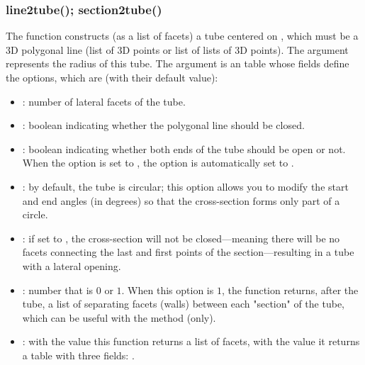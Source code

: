 \subsubsection{line2tube(); section2tube()}

The function  constructs (as a list of facets) a tube centered on , which must be a 3D polygonal line (list of 3D points or list of lists of 3D points). The argument  represents the radius of this tube. The argument  is an table whose fields define the options, which are (with their default value):
\begin{itemize}
    \item {}: number of lateral facets of the tube.
    
    \item {}: boolean indicating whether the polygonal line should be closed.
    
    \item {}: boolean indicating whether both ends of the tube should be open or not. When the  option is set to \true, the  option is automatically set to \true. 
    
    \item {} : by default, the tube is circular; this option allows you to modify the start and end angles (in degrees) so that the cross-section forms only part of a circle. 

    \item {} : if set to \true, the cross-section will not be closed—meaning there will be no facets connecting the last and first points of the section—resulting in a tube with a lateral opening.
          
    \item {}: number that is $0$ or $1$. When this option is $1$, the function returns, after the  tube, a list of separating facets (walls) between each "section" of the tube, which can be useful with the  method (only).
    
    \item {} : with the value \false this function returns a list of facets, with the value \true it returns a table with three fields: .    
\end{itemize}

